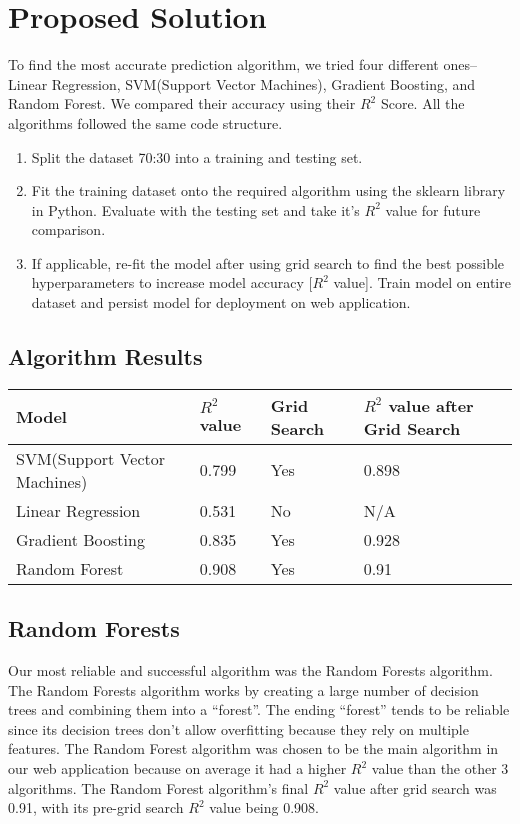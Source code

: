 \documentclass[main.tex]{subfiles}
\begin{document}
\section{Proposed Solution}
To find the most accurate prediction algorithm, we tried four different ones-- Linear Regression,
SVM(Support Vector Machines), Gradient Boosting, and Random Forest. We compared their
accuracy using their $R^2$ Score. All the algorithms followed the same code structure.
\begin{enumerate}[topsep=-1ex]
	\item Split the dataset 70:30 into a training and testing set.
	\item Fit the training dataset onto the required algorithm using the sklearn library in Python.
	Evaluate with the testing set and take it’s $R^2$ value for future comparison.
	\item If applicable, re-fit the model after using grid search to find the best possible
	hyperparameters to increase model accuracy [$R^2$ value].
	Train model on entire dataset and persist model for deployment on web application.
\end{enumerate}
\subsection{Algorithm Results}
\begin{tabular}{|l|l|l|l|}
	\hline
	Model & $R^2$ value & Grid Search & $R^2$ value after Grid Search\\
	\hline
	SVM(Support Vector Machines) & 0.799 & Yes & 0.898\\
	\hline
	Linear Regression & 0.531 & No & N/A\\
	\hline
	Gradient Boosting & 0.835 & Yes & 0.928\\
	\hline
	Random Forest & 0.908 & Yes & 0.91\\
	\hline
\end{tabular}

\subsection{Random Forests}
Our most reliable and successful algorithm was the Random Forests algorithm\cite{Donges2019}. The Random
Forests algorithm works by creating a large number of decision trees and combining them into a
“forest”. The ending “forest” tends to be reliable since its decision trees don’t allow overfitting
because they rely on multiple features. The Random Forest algorithm was chosen to be the main
algorithm in our web application because on average it had a higher $R^2$ value than the other 3
algorithms. The Random Forest algorithm's final $R^2$ value after grid search was 0.91, with its
pre-grid search $R^2$ value being 0.908.
\end{document}
